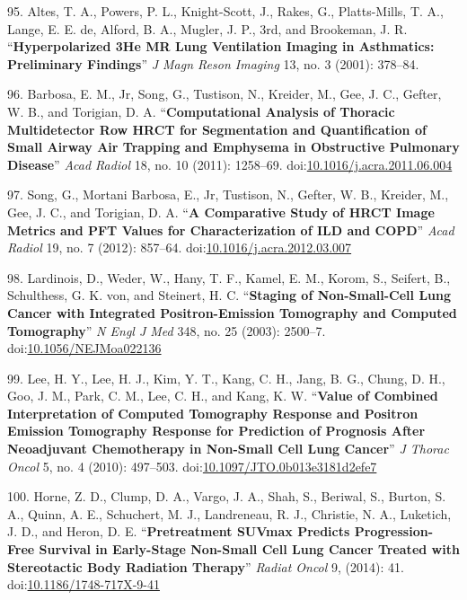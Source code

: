 \documentclass[11pt,]{article}
\begin{document}
\hypertarget{ref-Altes:2001aa}{}
95. Altes, T. A., Powers, P. L., Knight-Scott, J., Rakes, G.,
Platts-Mills, T. A., Lange, E. E. de, Alford, B. A., Mugler, J. P., 3rd,
and Brookeman, J. R. ``\textbf{Hyperpolarized 3He MR Lung Ventilation
Imaging in Asthmatics: Preliminary Findings}'' \emph{J Magn Reson
Imaging} 13, no. 3 (2001): 378--84.

\hypertarget{ref-Barbosa:2011aa}{}
96. Barbosa, E. M., Jr, Song, G., Tustison, N., Kreider, M., Gee, J. C.,
Gefter, W. B., and Torigian, D. A. ``\textbf{Computational Analysis of
Thoracic Multidetector Row HRCT for Segmentation and Quantification of
Small Airway Air Trapping and Emphysema in Obstructive Pulmonary
Disease}'' \emph{Acad Radiol} 18, no. 10 (2011): 1258--69.
doi:\href{https://doi.org/10.1016/j.acra.2011.06.004}{10.1016/j.acra.2011.06.004}

\hypertarget{ref-Song:2012aa}{}
97. Song, G., Mortani Barbosa, E., Jr, Tustison, N., Gefter, W. B.,
Kreider, M., Gee, J. C., and Torigian, D. A. ``\textbf{A Comparative
Study of HRCT Image Metrics and PFT Values for Characterization of ILD
and COPD}'' \emph{Acad Radiol} 19, no. 7 (2012): 857--64.
doi:\href{https://doi.org/10.1016/j.acra.2012.03.007}{10.1016/j.acra.2012.03.007}

\hypertarget{ref-Lardinois:2003aa}{}
98. Lardinois, D., Weder, W., Hany, T. F., Kamel, E. M., Korom, S.,
Seifert, B., Schulthess, G. K. von, and Steinert, H. C.
``\textbf{Staging of Non-Small-Cell Lung Cancer with Integrated
Positron-Emission Tomography and Computed Tomography}'' \emph{N Engl J
Med} 348, no. 25 (2003): 2500--7.
doi:\href{https://doi.org/10.1056/NEJMoa022136}{10.1056/NEJMoa022136}

\hypertarget{ref-Lee:2010aa}{}
99. Lee, H. Y., Lee, H. J., Kim, Y. T., Kang, C. H., Jang, B. G., Chung,
D. H., Goo, J. M., Park, C. M., Lee, C. H., and Kang, K. W.
``\textbf{Value of Combined Interpretation of Computed Tomography
Response and Positron Emission Tomography Response for Prediction of
Prognosis After Neoadjuvant Chemotherapy in Non-Small Cell Lung
Cancer}'' \emph{J Thorac Oncol} 5, no. 4 (2010): 497--503.
doi:\href{https://doi.org/10.1097/JTO.0b013e3181d2efe7}{10.1097/JTO.0b013e3181d2efe7}

\hypertarget{ref-Horne:2014aa}{}
100. Horne, Z. D., Clump, D. A., Vargo, J. A., Shah, S., Beriwal, S.,
Burton, S. A., Quinn, A. E., Schuchert, M. J., Landreneau, R. J.,
Christie, N. A., Luketich, J. D., and Heron, D. E.
``\textbf{Pretreatment SUVmax Predicts Progression-Free Survival in
Early-Stage Non-Small Cell Lung Cancer Treated with Stereotactic Body
Radiation Therapy}'' \emph{Radiat Oncol} 9, (2014): 41.
doi:\href{https://doi.org/10.1186/1748-717X-9-41}{10.1186/1748-717X-9-41}
\end{document}
